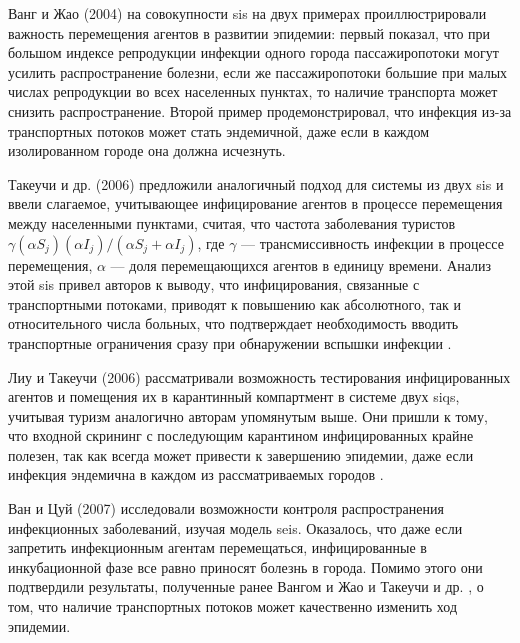 \documentclass[a4paper,12pt]{article} %
\begin{document}
Ванг и Жао (2004) \cite{wang2004epidemic} на совокупности \gls{sis} на двух примерах проиллюстрировали важность перемещения агентов в развитии эпидемии: первый показал, что при большом индексе репродукции инфекции одного города пассажиропотоки могут усилить распространение болезни, если же пассажиропотоки большие при малых числах репродукции во всех населенных пунктах, то наличие транспорта может снизить распространение. Второй пример продемонстрировал, что инфекция из-за транспортных потоков может стать эндемичной, даже если в каждом изолированном городе она должна исчезнуть.

Такеучи и др. (2006) \cite{takeuchi2006spreading} предложили аналогичный подход для системы из двух \gls{sis} и ввели слагаемое, учитывающее инфицирование агентов в процессе перемещения между населенными пунктами, считая, что частота заболевания туристов $\gamma(\alpha S_j)(\alpha I_j)/(\alpha S_j+\alpha I_j)$, где $\gamma$ --- трансмиссивность инфекции в процессе перемещения, $\alpha$ --- доля перемещающихся агентов в единицу времени. Анализ этой \gls{sis} привел авторов к выводу, что инфицирования, связанные с транспортными потоками, приводят к повышению как абсолютного, так и относительного числа больных, что подтверждает необходимость вводить транспортные ограничения сразу при обнаружении вспышки инфекции \cite{takeuchi2006spreading}.

Лиу и Такеучи (2006) \cite{liu2006spread} рассматривали возможность тестирования инфицированных агентов и помещения их в карантинный компартмент в системе двух \gls{siqs}, учитывая туризм аналогично авторам упомянутым выше. Они пришли к тому, что входной скрининг с последующим карантином инфицированных крайне полезен, так как всегда может привести к завершению эпидемии, даже если инфекция эндемична в каждом из рассматриваемых городов \cite{liu2006spread}.

Ван и Цуй (2007) \cite{wan2007seis} исследовали возможности контроля распространения инфекционных заболеваний, изучая модель \gls{seis}. Оказалось, что даже если запретить инфекционным агентам перемещаться, инфицированные в инкубационной фазе все равно приносят болезнь в города.                                                                                                                                                                                                                                                                                                                          Помимо этого они подтвердили результаты, полученные ранее Вангом и Жао \cite{wang2004epidemic} и Такеучи и др. \cite{takeuchi2006spreading}, о том, что наличие транспортных потоков может качественно изменить ход эпидемии.
\end{document}
